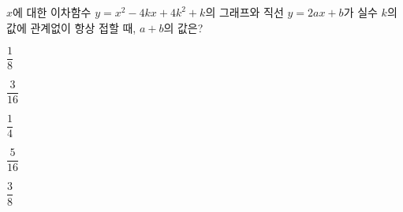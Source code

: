 $x$에 대한 이차함수 $y=x^2-4kx+4k^2+k$의 그래프와 직선 $y=2ax+b$가 실수 $k$의 값에 관계없이 항상 접할 때, $a+b$의 값은? 
\begin{choices32}{\rule[-3ex]{0pt}{8ex}$\dfrac{1}{8}$}{\rule[-3ex]{0pt}{8ex}$\dfrac{3}{16}$}{\rule[-3ex]{0pt}{8ex}$\dfrac{1}{4}$}{\rule[-3ex]{0pt}{8ex}$\dfrac{5}{16}$}{\rule[-3ex]{0pt}{8ex}$\dfrac{3}{8}$}\end{choices32}
